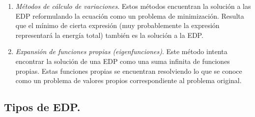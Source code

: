 \begin{enumerate}
\item \emph{Métodos de cálculo de variaciones}. Estos métodos encuentran la solución a las EDP reformulando la ecuación como un problema de minimización. Resulta que el mínimo de cierta expresión (muy probablemente la expresión representará la energía total) también es la solución a la EDP.
\item \emph{Expansión de funciones propias (eigenfunciones)}. Este método intenta encontrar la solución de una EDP como una suma infinita de funciones propias. Estas funciones propias se encuentran resolviendo lo que se conoce como un problema de valores propios correspondiente al problema original.
\end{enumerate}

\subsection{Tipos de EDP.}

